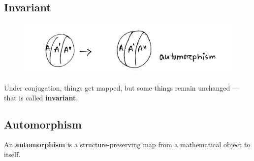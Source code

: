 \documentclass[14pt]{article} %
\begin{document}
\subsection*{Invariant} 
\vspace{-1cm}
\begin{figure}[H]
\centering
\includegraphics[width=0.7\linewidth]{L3_1.jpg}
\caption*{}
\end{figure}
\vspace{-1cm}
\noindent
Under conjugation, things get mapped, but some things remain unchanged — that is called \textbf{invariant}.

\subsection*{Automorphism}
An \textbf{automorphism} is a structure-preserving map from a mathematical object to itself.
\end{document}
